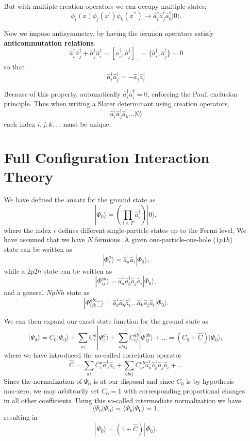 \documentclass[graybox,sectrefs,envcountresetchap,open=right]{svmonodo}
\begin{document}
But with multiple creation operators we can occupy multiple states:
\[
\phi_i(x) \phi_j(x^\prime) \phi_k(x^{\prime \prime}) 
\rightarrow \hat{a}^\dagger_i \hat{a}^\dagger_j \hat{a}^\dagger_k |0 \rangle.
\]

Now we impose antisymmetry, by having the fermion operators satisfy  \textbf{anticommutation relations}:
\[
\hat{a}^\dagger_i \hat{a}^\dagger_j + \hat{a}^\dagger_j \hat{a}^\dagger_i
= [ \hat{a}^\dagger_i ,\hat{a}^\dagger_j ]_+ 
= \{ \hat{a}^\dagger_i ,\hat{a}^\dagger_j \} = 0
\]
so that 
\[
\hat{a}^\dagger_i \hat{a}^\dagger_j = - \hat{a}^\dagger_j \hat{a}^\dagger_i
\]


Because of this property, automatically $\hat{a}^\dagger_i \hat{a}^\dagger_i = 0$, 
enforcing the Pauli exclusion principle.  Thus when writing a Slater determinant 
using creation operators, 
\[
\hat{a}^\dagger_i \hat{a}^\dagger_j \hat{a}^\dagger_k \ldots |0 \rangle
\]
each index $i,j,k, \ldots$ must be unique.




\section{Full Configuration Interaction Theory}

We have defined the ansatz for the ground state as 
\[
|\Phi_0\rangle = \left(\prod_{i\le F}\hat{a}_{i}^{\dagger}\right)|0\rangle,
\]
where the index $i$ defines different single-particle states up to the Fermi level. We have assumed that we have $N$ fermions. 
A given one-particle-one-hole ($1p1h$) state can be written as
\[
|\Phi_i^a\rangle = \hat{a}_{a}^{\dagger}\hat{a}_i|\Phi_0\rangle,
\]
while a $2p2h$ state can be written as
\[
|\Phi_{ij}^{ab}\rangle = \hat{a}_{a}^{\dagger}\hat{a}_{b}^{\dagger}\hat{a}_j\hat{a}_i|\Phi_0\rangle,
\]
and a general $NpNh$ state as 
\[
|\Phi_{ijk\dots}^{abc\dots}\rangle = \hat{a}_{a}^{\dagger}\hat{a}_{b}^{\dagger}\hat{a}_{c}^{\dagger}\dots\hat{a}_k\hat{a}_j\hat{a}_i|\Phi_0\rangle.
\]


We can then expand our exact state function for the ground state 
as
\[
|\Psi_0\rangle=C_0|\Phi_0\rangle+\sum_{ai}C_i^a|\Phi_i^a\rangle+\sum_{abij}C_{ij}^{ab}|\Phi_{ij}^{ab}\rangle+\dots
=(C_0+\hat{C})|\Phi_0\rangle,
\]
where we have introduced the so-called correlation operator 
\[
\hat{C}=\sum_{ai}C_i^a\hat{a}_{a}^{\dagger}\hat{a}_i  +\sum_{abij}C_{ij}^{ab}\hat{a}_{a}^{\dagger}\hat{a}_{b}^{\dagger}\hat{a}_j\hat{a}_i+\dots
\]
Since the normalization of $\Psi_0$ is at our disposal and since $C_0$ is by hypothesis non-zero, we may arbitrarily set $C_0=1$ with 
corresponding proportional changes in all other coefficients. Using this so-called intermediate normalization we have
\[
\langle \Psi_0 | \Phi_0 \rangle = \langle \Phi_0 | \Phi_0 \rangle = 1, 
\]
resulting in 
\[
|\Psi_0\rangle=(1+\hat{C})|\Phi_0\rangle.
\]
\end{document}
